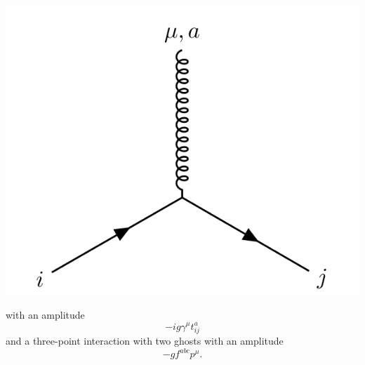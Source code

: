 \begin{center}
    \includegraphics[scale=0.75]{2019/03/20190309_gluontwofermion.PNG}
\end{center}
with an amplitude 
\begin{equation}
    -ig \gamma^\mu t_{ij}^a
\end{equation}
and a three-point interaction with two ghosts
with an amplitude
\begin{equation}
    -g f^{abc} p^\mu.
\end{equation}

